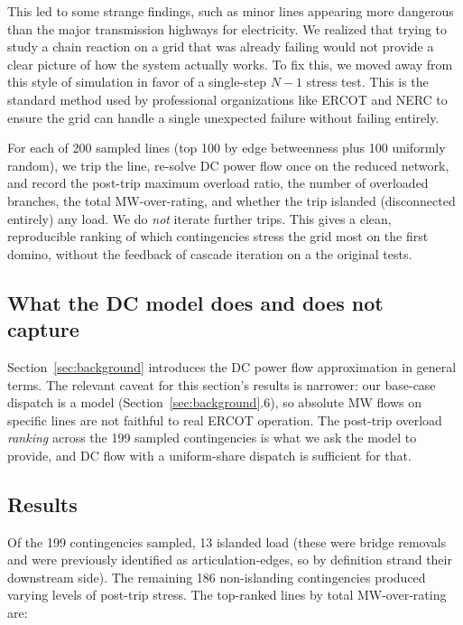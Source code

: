 \documentclass[12pt,letterpaper]{article}
\begin{document}
This led to some strange findings, such as minor lines appearing more dangerous than the major transmission highways for electricity. We realized that trying to study a chain reaction on a grid that was already failing would not provide a clear picture of how the system actually works. To fix this, we moved away from this style of simulation in favor of a single-step $N-1$ stress test. This is the standard method used by professional organizations like ERCOT and NERC to ensure the grid can handle a single unexpected failure without failing entirely.

For each of 200 sampled lines (top 100 by edge betweenness plus 100 uniformly random), we trip the line, re-solve DC power flow once on the reduced network, and record the post-trip maximum overload ratio, the number of overloaded branches, the total MW-over-rating, and whether the trip islanded (disconnected entirely) any load. We do \emph{not} iterate further trips. This gives a clean, reproducible ranking of which contingencies stress the grid most on the first domino, without the feedback of cascade iteration on a the original tests.

\subsection{What the DC model does and does not capture}

Section~\ref{sec:background} introduces the DC power flow approximation in general terms. The relevant caveat for this section's results is narrower: our base-case dispatch is a model (Section~\ref{sec:background}.6), so absolute MW flows on specific lines are not faithful to real ERCOT operation. The post-trip overload \emph{ranking} across the 199 sampled contingencies is what we ask the model to provide, and DC flow with a uniform-share dispatch is sufficient for that.

\subsection{Results}

Of the 199 contingencies sampled, 13 islanded load (these were bridge removals and were previously identified as articulation-edges, so by definition strand their downstream side). The remaining 186 non-islanding contingencies produced varying levels of post-trip stress. The top-ranked lines by total MW-over-rating are:
\end{document}
